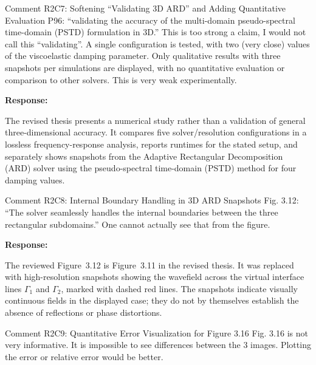 \documentclass[11pt,a4paper]{article}
\newenvironment{response}{
    \par\vspace{1mm}\noindent\textbf{\textcolor{responseframe}{Response:}}\par\vspace{1mm}
}{
    \par\vspace{3mm}
}
\begin{document}
\begin{revcomment}{Comment R2C7: Softening ``Validating 3D ARD'' and Adding Quantitative Evaluation}
P96: ``validating the accuracy of the multi-domain pseudo-spectral time-domain (PSTD) formulation in 3D.'' This is too strong a claim, I would not call this ``validating''. A single configuration is tested, with two (very close) values of the viscoelastic damping parameter. Only qualitative results with three snapshots per simulations are displayed, with no quantitative evaluation or comparison to other solvers. This is very weak experimentally.
\end{revcomment}

\begin{response}
The revised thesis presents a numerical study rather than a validation of general three-dimensional accuracy. It compares five solver/resolution configurations in a lossless frequency-response analysis, reports runtimes for the stated setup, and separately shows snapshots from the Adaptive Rectangular Decomposition (ARD) solver using the pseudo-spectral time-domain (PSTD) method for four damping values.
\end{response}

\begin{revcomment}{Comment R2C8: Internal Boundary Handling in 3D ARD Snapshots}
Fig. 3.12: ``The solver seamlessly handles the internal boundaries between the three rectangular subdomains.'' One cannot actually see that from the figure.
\end{revcomment}

\begin{response}
The reviewed Figure~3.12 is Figure~3.11 in the revised thesis. It was replaced with high-resolution snapshots showing the wavefield across the virtual interface lines $\Gamma_1$ and $\Gamma_2$, marked with dashed red lines. The snapshots indicate visually continuous fields in the displayed case; they do not by themselves establish the absence of reflections or phase distortions.
\end{response}

\begin{revcomment}{Comment R2C9: Quantitative Error Visualization for Figure 3.16}
Fig. 3.16 is not very informative. It is impossible to see differences between the 3 images. Plotting the error or relative error would be better.
\end{revcomment}
\end{document}
